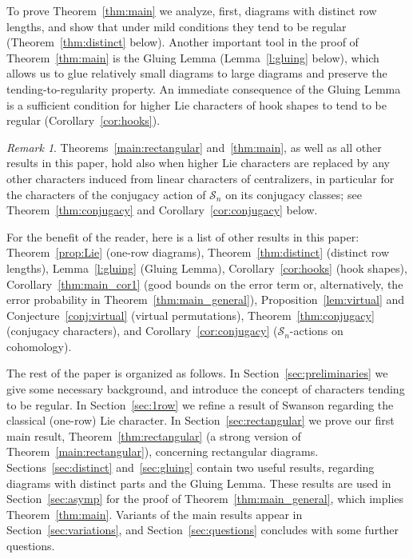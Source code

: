 \documentclass[12pt]%
{amsart}
\renewcommand\S{{\mathcal S}}
\theoremstyle{plain}
\theoremstyle{definition}
\theoremstyle{remark}
\newtheorem{remark}[theorem]{Remark}
\newcommand{\todo}[1]{\vspace{5 mm}\par \noindent
	\marginpar{\textsc{ToDo}} \framebox{\begin{minipage}[c]{0.95
				\textwidth}
			#1 \end{minipage}}\vspace{5 mm}\par}
\begin{document}

To prove Theorem~\ref{thm:main} we analyze, first, diagrams with distinct row lengths, and show that under mild conditions they tend to be regular (Theorem~\ref{thm:distinct} below).  
Another important tool in the proof of Theorem~\ref{thm:main} is the Gluing Lemma (Lemma~\ref{l:gluing} below),
which allows us to glue relatively small diagrams to 
large diagrams 
and preserve the tending-to-regularity property. 
An immediate consequence of the Gluing Lemma is a sufficient condition for higher Lie characters of 
hook shapes to tend to be regular (Corollary~\ref{cor:hooks}).   


\begin{remark}
    Theorems~\ref{main:rectangular} and~\ref{thm:main}, as well as all other results in this paper, hold also when higher Lie characters are replaced by any other characters induced from linear characters of centralizers, in particular for the characters of the conjugacy action of $\S_n$ on its conjugacy classes;
    see Theorem~\ref{thm:conjugacy} and Corollary~\ref{cor:conjugacy} below. 
\end{remark}

For the benefit of the reader, here is a list of other results in this paper: 
Theorem~\ref{prop:Lie} (one-row diagrams), 
Theorem~\ref{thm:distinct} (distinct row lengths),
Lemma~\ref{l:gluing} (Gluing Lemma),
Corollary~\ref{cor:hooks} (hook shapes),
Corollary~\ref{thm:main_cor1} (good bounds on the error term or, alternatively, the error probability in Theorem~\ref{thm:main_general}),
Proposition~\ref{lem:virtual} 
and Conjecture~\ref{conj:virtual} (virtual permutations),
Theorem~\ref{thm:conjugacy} (conjugacy characters),
and Corollary~\ref{cor:conjugacy} ($\S_n$-actions on cohomology).

The rest of the paper is organized as follows. 
In Section~\ref{sec:preliminaries} we 
give some necessary background,
and introduce the concept of characters tending to be regular. 
In Section~\ref{sec:1row} we refine a result of Swanson regarding the classical (one-row) Lie character.
In Section~\ref{sec:rectangular} we prove our first main result, Theorem~\ref{thm:rectangular} (a strong version of Theorem~\ref{main:rectangular}), concerning rectangular diagrams.
Sections~\ref{sec:distinct} and~\ref{sec:gluing} contain two useful results, regarding diagrams with distinct parts and the Gluing Lemma. 
These results are used in Section~\ref{sec:asymp} for the proof of Theorem~\ref{thm:main_general}, which implies Theorem~\ref{thm:main}.
Variants of the main results appear in Section~\ref{sec:variations}, and Section~\ref{sec:questions} concludes with some further questions.
\end{document}
